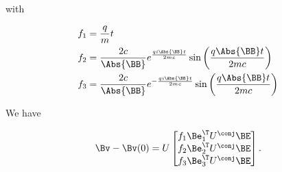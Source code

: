 with

\begin{align}\label{eqn:lorentzRotation:n}
f_1 &= \frac{q}{m} t \\
f_2 &= \frac{2 c }{\Abs{\BB}} e^{ \frac{q i \Abs{\BB} t}{ 2 m c } } \sin \left( \frac{q \Abs{\BB} t}{ 2 m c } \right) \\
f_3 &= \frac{2 c }{\Abs{\BB}} e^{ -\frac{q i \Abs{\BB} t}{ 2 m c } } \sin \left( \frac{q \Abs{\BB} t}{ 2 m c } \right)
\end{align}

We have

\begin{equation}\label{eqn:lorentzRotation:n}
\Bv - \Bv(0) = U
\begin{bmatrix}
f_1 \Be_1^\T U^\conj \BE \\
f_2 \Be_2^\T U^\conj \BE \\
f_3 \Be_3^\T U^\conj \BE \\
\end{bmatrix}.
\end{equation}

\EndArticle
